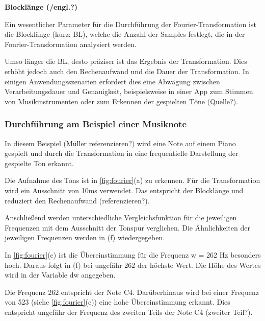 \par

%
\textbf{Blocklänge (/engl.?)}
%

Ein wesentlicher Parameter für die Durchführung der Fourier-Transformation ist die Blocklänge (kurz: BL), welche die Anzahl der Samples festlegt, die in der Fourier-Transformation analysiert werden.

\par

Umso länger die BL, desto präziser ist das Ergebnis der Transformation. Dies erhöht jedoch auch den Rechenaufwand und die Dauer der Transformation. In einigen Anwendungsszenarien erfordert dies eine Abwägung zwischen Verarbeitungsdauer und Genauigkeit, beispielsweise in einer App zum Stimmen von Musikinstrumenten oder zum Erkennen der gespielten Töne (Quelle?).

\par

\subsubsection{Durchführung am Beispiel einer Musiknote}

In diesem Beispiel (Müller referenzieren?) wird eine Note auf einem Piano gespielt und durch die Transformation in eine frequentielle Darstellung der gespielte Ton erkannt.

\par

Die Aufnahme des Tons ist in \cref{fig:fourier}(a) zu erkennen. Für die Transformation wird ein Ausschnitt von 10ms verwendet. Das entspricht der Blocklänge und reduziert den Rechenaufwand (referenzieren?).

\par

Anschließend werden unterschiedliche Vergleichsfunktion für die jeweiligen Frequenzen mit dem Ausschnitt der Tonspur verglichen. Die Ähnlichkeiten der jeweiligen Frequenzen werden in (f) wiedergegeben.

\par

In \cref{fig:fourier}(c) ist die Übereinstimmung für die Frequenz w = 262 Hz besonders hoch. Daraus folgt in (f) bei ungefähr 262 der höchste Wert. Die Höhe des Wertes wird in der Variable dw angegeben.


\par

Die Frequenz 262 entspricht der Note C4. Darüberhinaus wird bei einer Frequenz von 523 (siehe \cref{fig:fourier}(e)) eine hohe Übereinstimmung erkannt. Dies entspricht ungefähr der Frequenz des zweiten Teils der Note C4 (zweiter Teil?).

